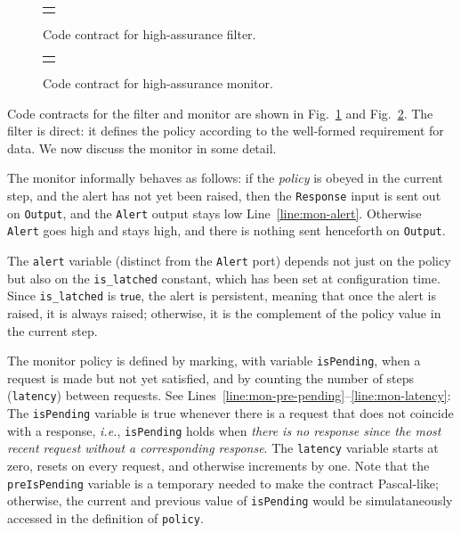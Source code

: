 \documentclass[global,twocolumn]{svjour}
\newcommand{\konst}[1]{\ensuremath{\mathsf{#1}}}
\newcommand{\figref}[1]{Fig.~\ref{#1}}
\newcommand{\lineref}[1]{Line~\ref{#1}}
\newcommand{\linesref}[2]{Lines~\ref{#1}--\ref{#2}}
\newcommand{\ie}{\textit{i.e.}}
\begin{document}
\begin{figure}
  \begin{center}
    \begin{tabular}{c}
      \resizebox{\columnwidth}{!}{\usebox{\flt}} \\
    \end{tabular}
  \end{center}
  \caption{Code contract for high-assurance filter.}
  \label{fig:filter}
\end{figure}

\begin{figure}
  \begin{center}
    \begin{tabular}{c}
      \resizebox{\columnwidth}{!}{\usebox{\mntr}} \\
    \end{tabular}
  \end{center}
  \caption{Code contract for high-assurance monitor.}
  \label{fig:monitor}
\end{figure}

Code contracts for the filter and monitor are shown in \figref{fig:filter} and \figref{fig:monitor}.
%
The filter is direct: it defines the policy according to the well-formed requirement for data.
%
We now discuss the monitor in some detail.

The monitor informally behaves as follows: if the \emph{policy} is obeyed in the current step, and the alert has not yet been raised, then the \texttt{Response} input is sent out on \texttt{Output}, and the \texttt{Alert} output stays low \lineref{line:mon-alert}.
%
Otherwise \texttt{Alert} goes high and stays high, and there is nothing sent henceforth on \texttt{Output}.

The \texttt{alert} variable (distinct from the \texttt{Alert} port) depends not just on the policy but also on the \texttt{is\_latched} constant, which has been set at configuration time.
%
Since \texttt{is\_latched} is \konst{true}, the alert is persistent, meaning that once the alert is raised, it is always raised;
%
otherwise, it is the complement of the policy value in the current step.

The monitor policy is defined by marking, with variable \texttt{isPending}, when a request is made but not yet satisfied, and by counting the number of steps (\texttt{latency}) between requests.
%
See \linesref{line:mon-pre-pending}{line:mon-latency}:
%
The \texttt{isPending} variable is true whenever there is a request that does not coincide with a response, \ie, \texttt{isPending} holds when \emph{there is no response since the most recent request without a corresponding response}.
%
The \texttt{latency} variable starts at zero, resets on every request, and otherwise increments by one.  Note that the \texttt{preIsPending} variable is a temporary needed to make the contract Pascal-like;
%
otherwise, the current and previous value of \texttt{isPending} would be simulataneously accessed in the definition of \texttt{policy}.
\end{document}
